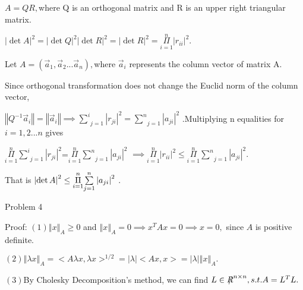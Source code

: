 \documentclass{article}
\begin{document}
$A=QR,$where Q is an orthogonal matrix and R is an upper right triangular
matrix.

$\left\vert \det A\right\vert ^{2}=\left\vert \det Q\right\vert
^{2}\left\vert \det R\right\vert ^{2}=\left\vert \det R\right\vert ^{2}=%
\underset{i=1}{\overset{n}{\Pi }}\left\vert r_{ii}\right\vert ^{2}.$

Let $A=\left( \vec{a}_{1},\vec{a}_{2}...\vec{a}_{n}\right) ,$where $\vec{a}%
_{i}$ represents the column vector of matrix A.

Since orthogonal transformation does not change the Euclid norm of the
column vector,

$\left\Vert Q^{-1}\vec{a}_{i}\right\Vert =\left\Vert \vec{a}_{i}\right\Vert
\implies \underset{j=1}{\overset{i}{\sum }}\left\vert r_{ji}\right\vert ^{2}=%
\underset{j=1}{\overset{n}{\sum }}\left\vert a_{ji}\right\vert ^{2}$
.Multiplying n equalities for $i=1,2...n$ gives

$\underset{i=1}{\overset{n}{\Pi }}\underset{j=1}{\overset{i}{\sum }}%
\left\vert r_{ji}\right\vert ^{2}$=$\underset{i=1}{\overset{n}{\Pi }}%
\underset{j=1}{\overset{n}{\sum }}\left\vert a_{ji}\right\vert ^{2}$ $%
\implies \underset{i=1}{\overset{n}{\Pi }}\left\vert r_{ii}\right\vert
^{2}\leq \underset{i=1}{\overset{n}{\Pi }}\underset{j=1}{\overset{n}{\sum }}%
\left\vert a_{ji}\right\vert ^{2}.$

That is $\left\vert \det A\right\vert ^{2}\leq \underset{i=1}{\overset{n}{%
\Pi }}\underset{j=1}{\overset{n}{\sum }}\left\vert a_{ji}\right\vert ^{2}$ .


Problem 4

Proof: $\left( 1\right) \left\Vert x\right\Vert _{A}\geq 0$ and $\left\Vert
x\right\Vert _{A}=0\implies x^{T}Ax=0\implies x=0,$ since $A$ is positive
definite.

$\left( 2\right) \left\Vert \lambda x\right\Vert _{A}=<A\lambda x,\lambda
x>^{1/2}=\left\vert \lambda \right\vert <Ax,x>=\left\vert \lambda
\right\vert \left\Vert x\right\Vert _{A}.$

$\left( 3\right) $By Cholesky Decomposition's method, we can find $L\in \NEG%
{R}^{n\times n},s.t.A=L^{T}L.$
\end{document}
